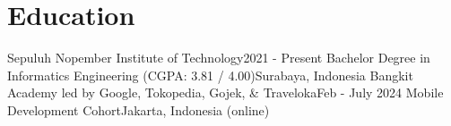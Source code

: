 \section{Education}
    \resumeSubHeadingListStart

    \resumeSubheading
    {Sepuluh Nopember Institute of Technology}{2021 - Present}
    {Bachelor Degree in Informatics Engineering (CGPA: 3.81 / 4.00)}{Surabaya, Indonesia}
    \resumeSubheading
    {Bangkit Academy led by Google, Tokopedia, Gojek, \& Traveloka}{Feb - July 2024}
    {Mobile Development Cohort}{Jakarta, Indonesia (online)}

    \resumeSubHeadingListEnd